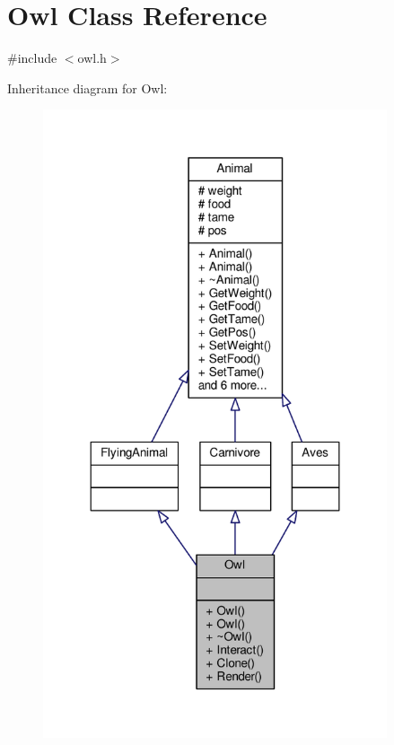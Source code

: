 \hypertarget{classOwl}{}\section{Owl Class Reference}
\label{classOwl}


{\ttfamily \#include $<$owl.\+h$>$}



Inheritance diagram for Owl\+:
\nopagebreak
\begin{figure}[H]
\begin{center}
\leavevmode
\includegraphics[width=287pt]{classOwl__inherit__graph}
\end{center}
\end{figure}


